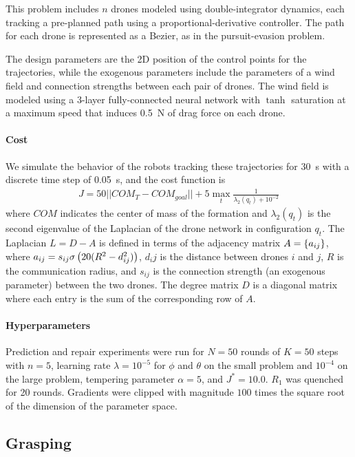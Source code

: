 This problem includes $n$ drones modeled using double-integrator dynamics, each tracking a pre-planned path using a proportional-derivative controller. The path for each drone is represented as a Bezier, as in the pursuit-evasion problem.

The design parameters are the 2D position of the control points for the trajectories, while the exogenous parameters include the parameters of a wind field and connection strengths between each pair of drones. The wind field is modeled using a 3-layer fully-connected neural network with $\tanh$ saturation at a maximum speed that induces \SI{0.5}{N} of drag force on each drone.

\paragraph{Cost} We simulate the behavior of the robots tracking these trajectories for \SI{30}{s} with a discrete time step of \SI{0.05}{s}, and the cost function is
\begin{align*}
    J = 50 ||COM_T - COM_{goal}|| + 5 \max_{t} \frac{1}{\lambda_2(q_t) + 10^{-2}}
\end{align*}
%
where $COM$ indicates the center of mass of the formation and $\lambda_2(q_t)$ is the second eigenvalue of the Laplacian of the drone network in configuration $q_t$. The Laplacian $L = D - A$ is defined in terms of the adjacency matrix $A = \left\{a_{ij}\right\}$, where $a_{ij} = s_{ij}\sigma\left( 20 (R^2 - d_{ij}^2) \right)$, $d_ij$ is the distance between drones $i$ and $j$, $R$ is the communication radius, and $s_{ij}$ is the connection strength (an exogenous parameter) between the two drones. The degree matrix $D$ is a diagonal matrix where each entry is the sum of the corresponding row of $A$.

\paragraph{Hyperparameters} Prediction and repair experiments were run for $N=50$ rounds of $K=50$ steps with $n=5$, learning rate $\lambda = 10^{-5}$ for $\phi$ and $\theta$ on the small problem and $10^{-4}$ on the large problem, tempering parameter $\alpha = 5$, and $J^* = 10.0$.  $R_1$ was quenched for 20 rounds. Gradients were clipped with magnitude $100$ times the square root of the dimension of the parameter space.

\subsection{Grasping}


